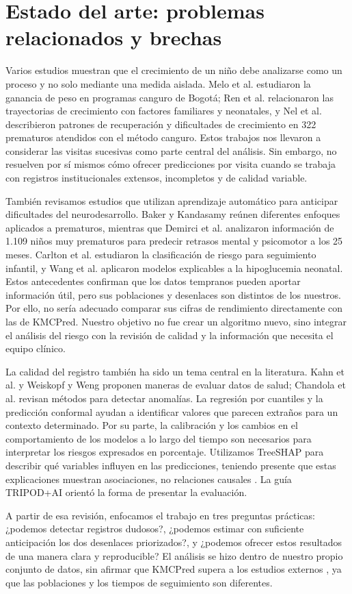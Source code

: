 \section{Estado del arte: problemas relacionados y brechas}
\label{sec:estado}

Varios estudios muestran que el crecimiento de un niño debe analizarse como un proceso y no solo mediante una medida aislada. Melo et al. \cite{r5} estudiaron la ganancia de peso en programas canguro de Bogotá; Ren et al. \cite{r6} relacionaron las trayectorias de crecimiento con factores familiares y neonatales, y Nel et al. \cite{r7} describieron patrones de recuperación y dificultades de crecimiento en 322 prematuros atendidos con el método canguro. Estos trabajos nos llevaron a considerar las visitas sucesivas como parte central del análisis. Sin embargo, no resuelven por sí mismos cómo ofrecer predicciones por visita cuando se trabaja con registros institucionales extensos, incompletos y de calidad variable.

También revisamos estudios que utilizan aprendizaje automático para anticipar dificultades del neurodesarrollo. Baker y Kandasamy \cite{r8} reúnen diferentes enfoques aplicados a prematuros, mientras que Demirci et al. \cite{r9} analizaron información de 1.109 niños muy prematuros para predecir retrasos mental y psicomotor a los 25 meses. Carlton et al. \cite{r10} estudiaron la clasificación de riesgo para seguimiento infantil, y Wang et al. \cite{r11} aplicaron modelos explicables a la hipoglucemia neonatal. Estos antecedentes confirman que los datos tempranos pueden aportar información útil, pero sus poblaciones y desenlaces son distintos de los nuestros. Por ello, no sería adecuado comparar sus cifras de rendimiento directamente con las de KMCPred. Nuestro objetivo no fue crear un algoritmo nuevo, sino integrar el análisis del riesgo con la revisión de calidad y la información que necesita el equipo clínico.

La calidad del registro también ha sido un tema central en la literatura. Kahn et al. \cite{r12} y Weiskopf y Weng \cite{r13} proponen maneras de evaluar datos de salud; Chandola et al. \cite{r14} revisan métodos para detectar anomalías. La regresión por cuantiles y la predicción conformal \cite{r15,r16,r17} ayudan a identificar valores que parecen extraños para un contexto determinado. Por su parte, la calibración y los cambios en el comportamiento de los modelos a lo largo del tiempo \cite{r18,r19,r20} son necesarios para interpretar los riesgos expresados en porcentaje. Utilizamos TreeSHAP \cite{r21} para describir qué variables influyen en las predicciones, teniendo presente que estas explicaciones muestran asociaciones, no relaciones causales \cite{r22,r23}. La guía TRIPOD+AI \cite{r24} orientó la forma de presentar la evaluación.

A partir de esa revisión, enfocamos el trabajo en tres preguntas prácticas: ¿podemos detectar registros dudosos?, ¿podemos estimar con suficiente anticipación los dos desenlaces priorizados?, y ¿podemos ofrecer estos resultados de una manera clara y reproducible? El análisis se hizo dentro de nuestro propio conjunto de datos, sin afirmar que KMCPred supera a los estudios externos \cite{r5,r6,r7,r8,r9,r10,r11}, ya que las poblaciones y los tiempos de seguimiento son diferentes.
